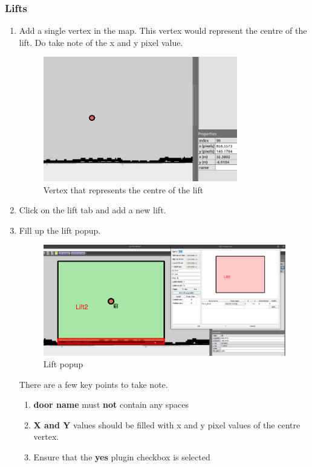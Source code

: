 \documentclass[11pt]{article}
\begin{document}
\subsubsection{Lifts}
\begin{enumerate}
 \item {
       Add a single vertex in the map. This vertex would represent the centre of the lift.
       Do take note of the x and y pixel value.
       \begin{figure}[H]
        \centering
        \includegraphics[width=0.8\textwidth]{images/lift_centre}
        \caption{Vertex that represents the centre of the lift}
       \end{figure}
       }
 \item {
       Click on the lift tab and add a new lift.
       }
 \item {
       Fill up the lift popup.
       \begin{figure}[H]
        \centering
        \includegraphics[width=1.0\textwidth]{images/lift_filled}
        \caption{Lift popup}
       \end{figure}
       There are a few key points to take note.
       \begin{enumerate}
        \item {\textbf{door name} must \textbf{not} contain any spaces}
        \item {\textbf{X and Y} values should be filled with x and y pixel values of the centre vertex. }
        \item {Ensure that the \textbf{yes} plugin checkbox is selected }
              
       \end{enumerate}
       
       }
\end{enumerate}
\end{document}
